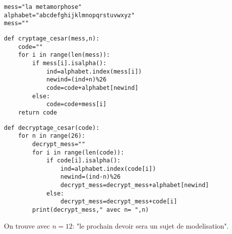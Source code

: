 


\question{}

\begin{center}
\begin{lstlisting}
mess="la metamorphose"
alphabet="abcdefghijklmnopqrstuvwxyz"
mess=""
\end{lstlisting}
\end{center}





\question{}


\begin{center}
\begin{lstlisting}
def cryptage_cesar(mess,n):
    code=""
    for i in range(len(mess)):
        if mess[i].isalpha():
            ind=alphabet.index(mess[i])
            newind=(ind+n)%26
            code=code+alphabet[newind]
        else:
            code=code+mess[i]
    return code
\end{lstlisting}
\end{center}

\question{}

\begin{center}
\begin{lstlisting}
def decryptage_cesar(code):
    for n in range(26):
        decrypt_mess=""
        for i in range(len(code)):
            if code[i].isalpha():
                ind=alphabet.index(code[i])
                newind=(ind-n)%26
                decrypt_mess=decrypt_mess+alphabet[newind]
            else:
                decrypt_mess=decrypt_mess+code[i]
        print(decrypt_mess," avec n= ",n)
\end{lstlisting}
\end{center}


\question{}


On trouve avec $n=12$:  "le prochain devoir sera un sujet de modelisation".



